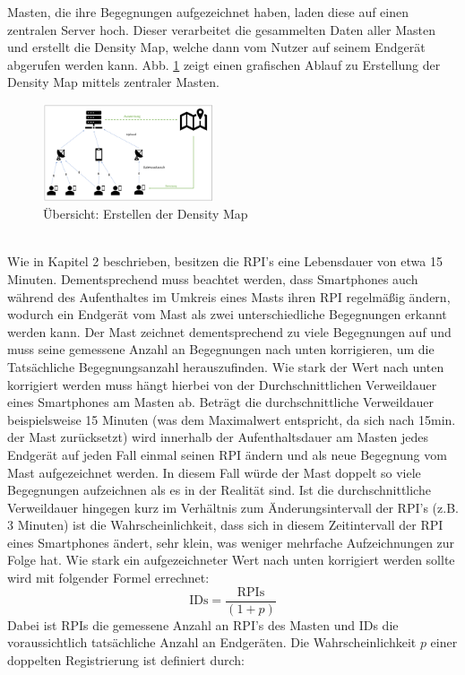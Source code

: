 \documentclass[conference]{IEEEtran}
\begin{document}
Masten, die ihre Begegnungen aufgezeichnet haben, laden diese auf einen zentralen Server hoch. 
Dieser verarbeitet die gesammelten Daten aller Masten und erstellt die Density Map, welche dann vom Nutzer auf seinem Endgerät abgerufen werden kann.
Abb. \ref{density_creation} zeigt einen grafischen Ablauf zu Erstellung der Density Map mittels zentraler Masten. \\
\begin{figure}[h]
	\centering
	\includegraphics[width=0.45\textwidth]{"Density_Map_Overview"}
	\caption{Übersicht: Erstellen der Density Map}
	\label{density_creation}
\end{figure} 
\\
Wie in Kapitel 2 beschrieben, besitzen die RPI's eine Lebensdauer von etwa 15 Minuten. 
Dementsprechend muss beachtet werden, dass Smartphones auch  während des Aufenthaltes im Umkreis eines Masts ihren RPI regelmäßig ändern, wodurch ein Endgerät vom Mast als zwei unterschiedliche Begegnungen erkannt werden kann. 
Der Mast zeichnet dementsprechend zu viele Begegnungen auf und muss seine gemessene Anzahl an Begegnungen nach unten korrigieren, um die Tatsächliche Begegnungsanzahl herauszufinden. 
Wie stark der Wert nach unten korrigiert werden muss hängt hierbei von der Durchschnittlichen Verweildauer eines Smartphones am Masten ab. 
Beträgt die durchschnittliche Verweildauer beispielsweise 15 Minuten (was dem Maximalwert entspricht, da sich nach 15min. der Mast zurücksetzt) wird innerhalb der Aufenthaltsdauer am Masten jedes Endgerät auf jeden Fall einmal seinen RPI ändern und als neue Begegnung vom Mast aufgezeichnet werden. 
In diesem Fall würde der Mast doppelt so viele Begegnungen aufzeichnen als es in der Realität sind.
Ist die durchschnittliche Verweildauer hingegen kurz im Verhältnis zum Änderungsintervall der RPI's (z.B. 3 Minuten) ist die Wahrscheinlichkeit,  dass sich in diesem Zeitintervall der RPI eines Smartphones ändert, sehr klein, was weniger mehrfache Aufzeichnungen zur Folge hat. 
Wie stark ein aufgezeichneter Wert nach unten korrigiert werden sollte wird mit folgender Formel errechnet: 
\begin{equation}
	\text{IDs} = \frac{\text{RPIs}}{(1+p)}
\end{equation}
Dabei ist \glqq RPIs\grqq{} die gemessene Anzahl an RPI's des Masten und \glqq IDs\grqq{}  die voraussichtlich tatsächliche Anzahl an Endgeräten.
Die Wahrscheinlichkeit $p$ einer doppelten Registrierung ist definiert durch:
\end{document}

